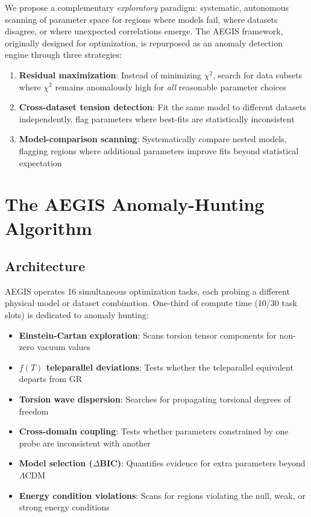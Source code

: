 \documentclass[twocolumn,showpacs,preprintnumbers,amsmath,amssymb,prl]{revtex4-2}
\begin{document}
We propose a complementary \textit{exploratory} paradigm: systematic, autonomous scanning of parameter space for regions where models fail, where datasets disagree, or where unexpected correlations emerge. The AEGIS framework, originally designed for optimization, is repurposed as an anomaly detection engine through three strategies:

\begin{enumerate}
\item \textbf{Residual maximization}: Instead of minimizing $\chi^2$, search for data subsets where $\chi^2$ remains anomalously high for \textit{all} reasonable parameter choices
\item \textbf{Cross-dataset tension detection}: Fit the same model to different datasets independently, flag parameters where best-fits are statistically inconsistent
\item \textbf{Model-comparison scanning}: Systematically compare nested models, flagging regions where additional parameters improve fits beyond statistical expectation
\end{enumerate}

\section{The AEGIS Anomaly-Hunting Algorithm}

\subsection{Architecture}

AEGIS operates 16 simultaneous optimization tasks, each probing a different physical model or dataset combination. One-third of compute time (10/30 task slots) is dedicated to anomaly hunting:

\begin{itemize}
\item \textbf{Einstein-Cartan exploration}: Scans torsion tensor components for non-zero vacuum values
\item \textbf{$f(T)$ teleparallel deviations}: Tests whether the teleparallel equivalent departs from GR
\item \textbf{Torsion wave dispersion}: Searches for propagating torsional degrees of freedom
\item \textbf{Cross-domain coupling}: Tests whether parameters constrained by one probe are inconsistent with another
\item \textbf{Model selection ($\Delta$BIC)}: Quantifies evidence for extra parameters beyond $\Lambda$CDM
\item \textbf{Energy condition violations}: Scans for regions violating the null, weak, or strong energy conditions
\end{itemize}
\end{document}
